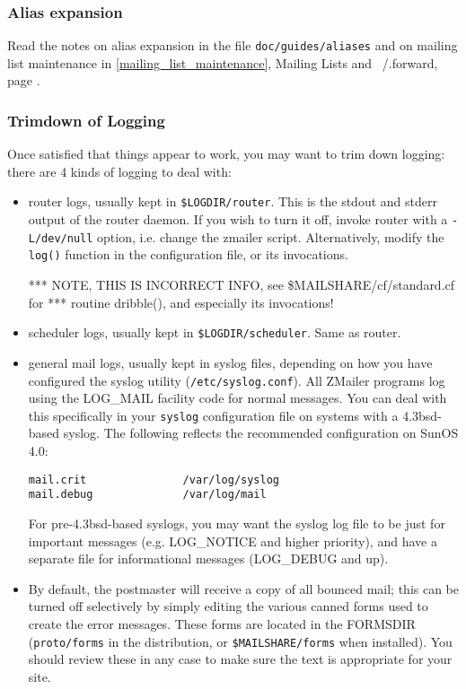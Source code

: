 \subsubsection{Alias expansion}

Read the notes on alias expansion in the file {\tt doc/guides/aliases} and
on mailing list maintenance in \ref{mailing_list_maintenance}, 
Mailing Lists and ~/.forward, page \pageref{mailing_list_maintenance}.




\subsubsection{Trimdown of Logging}

Once satisfied that things appear to work, you may want to trim down
logging: there are 4 kinds of logging to deal with:
\begin{itemize}
\item router logs, usually kept in {\tt \$LOGDIR/router}.  This is the stdout
and stderr output of the router daemon.  If you wish to turn it off,
invoke router with a {\tt -L/dev/null} option, i.e. change the zmailer
script.  Alternatively, modify the {\tt log()} function in the
configuration file, or its invocations.

*** NOTE, THIS IS INCORRECT INFO, see  \$MAILSHARE/cf/standard.cf for
*** routine   dribble(),  and especially its invocations!
\item scheduler logs, usually kept in {\tt \$LOGDIR/scheduler}.  Same as router.
\item general mail logs, usually kept in syslog files, depending on how
you have configured the syslog utility ({\tt /etc/syslog.conf}).  All
ZMailer programs log using the LOG\_MAIL facility code for normal
messages.  You can deal with this specifically in your {\tt syslog}
configuration file on systems with a 4.3bsd-based syslog.  The
following reflects the recommended configuration on SunOS 4.0:
\begin{tscreen}
\begin{verbatim}
mail.crit               /var/log/syslog
mail.debug              /var/log/mail
\end{verbatim}
\end{tscreen}

For pre-4.3bsd-based syslogs, you may want the syslog log file
to be just for important messages (e.g. LOG\_NOTICE and higher
priority), and have a separate file for informational messages
(LOG\_DEBUG and up).
\item By default, the postmaster will receive a copy of all bounced
mail; this can be turned off selectively by simply editing the
various canned forms used to create the error messages.  These
forms are located in the FORMSDIR ({\tt proto/forms} in the distribution,
or {\tt \$MAILSHARE/forms} when installed).  You should review these
in any case to make sure the text is appropriate for your site.
\end{itemize}





